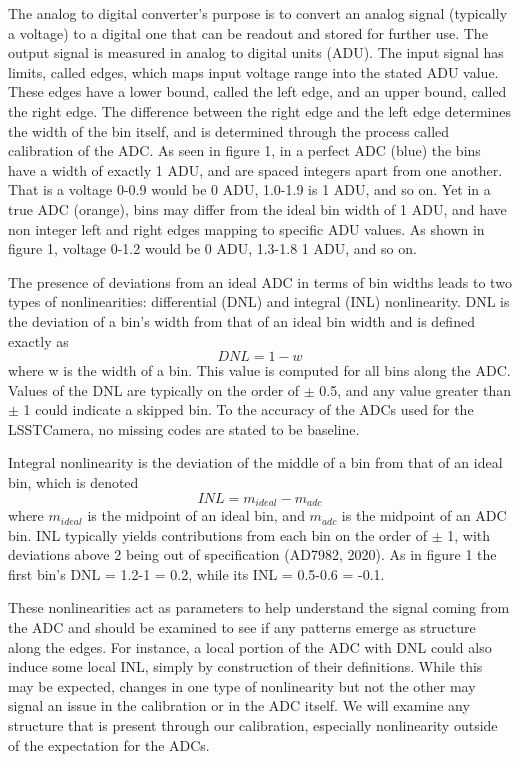 \documentclass[11pt, letterpaper]{article}
\begin{document}
The analog to digital converter’s purpose is to convert an analog signal (typically a voltage) to a digital one that can be readout and stored for further use. 
The output signal is measured in analog to digital units (ADU). 
The input signal has limits, called edges, which maps input voltage range into the stated ADU value. 
These edges have a lower bound, called the left edge, and an upper bound, called the right edge.
The difference between the right edge and the left edge determines the width of the bin itself, and is determined through the process called calibration of the ADC. 
As seen in figure 1, in a perfect ADC (blue) the bins have a width of exactly 1 ADU, and are spaced integers apart from one another. 
That is a voltage 0-0.9 would be 0 ADU, 1.0-1.9 is 1 ADU, and so on. 
Yet in a true ADC (orange), bins may differ from the ideal bin width of 1 ADU, and have non integer left and right edges mapping to specific ADU values. 
As shown in figure 1, voltage 0-1.2 would be 0 ADU, 1.3-1.8 1 ADU, and so on. 
\indent 


The presence of deviations from an ideal ADC in terms of bin widths leads to two types of nonlinearities: differential (DNL) and integral (INL) nonlinearity. 
DNL is the deviation of a bin's width from that of an ideal bin width and is defined exactly as
\begin{equation}
DNL =1- w  
\end{equation}
where w is the width of a bin. 
This value is computed for all bins along the ADC. 
Values of the DNL are typically on the order of $\pm$ 0.5, and any value greater than $\pm$ 1 could indicate a skipped bin. 
To the accuracy of the ADCs used for the LSSTCamera, no missing codes are stated to be baseline.
\indent


Integral nonlinearity is the deviation of the middle of a bin from that of an ideal bin, which is denoted 
\begin{equation}
INL = m_{ideal} - m_{adc} 
\end{equation}
where $m_{ideal}$ is the midpoint of an ideal bin, and $m_{adc}$ is the midpoint of an ADC bin. 
INL typically yields contributions from each bin on the order of $\pm$ 1, with deviations above 2 being out of specification (AD7982, 2020). 
As in figure 1 the first bin's DNL = 1.2-1 = 0.2, while its INL = 0.5-0.6 = -0.1. 
\indent


These nonlinearities act as parameters to help understand the signal coming from the ADC and should be examined to see if any patterns emerge as structure along the edges. 
For instance, a local portion of the ADC with DNL could also induce some local INL, simply by construction of their definitions.
While this may be expected, changes in one type of nonlinearity but not the other may signal an issue in the calibration or in the ADC itself.
We will examine any structure that is present through our calibration, especially nonlinearity outside of the expectation for the ADCs. 
\end{document}
